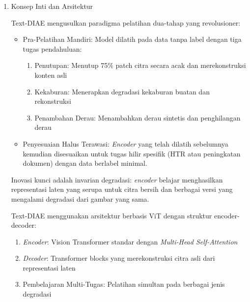 \begin{enumerate}[leftmargin=*, labelsep=0.5em, itemindent=0pt, label=\arabic*., topsep=0pt, partopsep=0pt]

\item Konsep Inti dan Arsitektur

Text-DIAE mengusulkan paradigma pelatihan dua-tahap yang revolusioner:

\begin{itemize}[leftmargin=1.5em]
      \item Pra-Pelatihan Mandiri: Model dilatih pada data tanpa label dengan tiga tugas pendahuluan:
      \begin{enumerate}[leftmargin=1.5em, labelsep=0.5em, itemindent=0pt, label=\alph*., topsep=0pt, parsep=0pt, itemsep=0pt]
            \item Penutupan: Menutup 75\% patch citra secara acak dan merekonstruksi konten asli
            \item Kekaburan: Menerapkan degradasi kekaburan buatan dan rekonstruksi
            \item Penambahan Derau: Menambahkan derau sintetis dan penghilangan derau
      \end{enumerate}
      
      \item Penyesuaian Halus Terawasi: \textit{Encoder} yang telah dilatih sebelumnya kemudian disesuaikan untuk tugas hilir spesifik (HTR atau peningkatan dokumen) dengan data berlabel minimal.
\end{itemize}

Inovasi kunci adalah invarian degradasi: \textit{encoder} belajar menghasilkan representasi laten yang serupa untuk citra bersih dan berbagai versi yang mengalami degradasi dari gambar yang sama.

Text-DIAE menggunakan arsitektur berbasis ViT dengan struktur encoder-decoder:
\begin{enumerate}[leftmargin=1.5em, labelsep=0.5em, itemindent=0pt, label=\alph*., topsep=0pt, parsep=0pt, itemsep=0pt]
      \item \textit{Encoder}: Vision Transformer standar dengan \textit{Multi-Head Self-Attention}
      \item \textit{Decoder}: Transformer blocks yang merekonstruksi citra asli dari representasi laten
      \item Pembelajaran Multi-Tugas: Pelatihan simultan pada berbagai jenis degradasi
\end{enumerate}


\end{enumerate}
